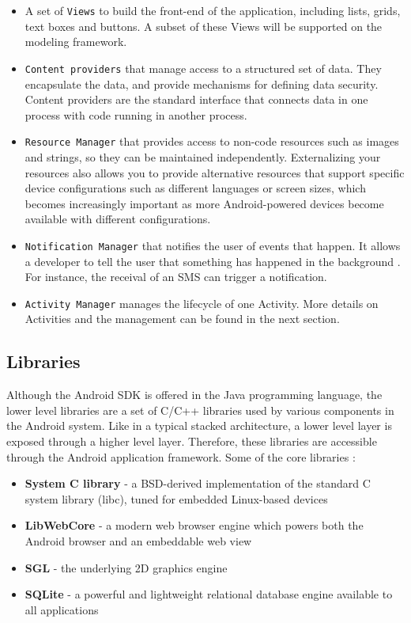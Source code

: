 \begin{itemize}
\item{A set of \texttt{Views} to build the front-end of the application, including lists, grids, text boxes and buttons. A subset of these Views will be supported on the modeling framework.}
\item{\texttt{Content providers} that manage access to a structured set of data. They encapsulate the data, and provide mechanisms for defining data security. Content providers are the standard interface that connects data in one process with code running in another process. \cite{ContentProviders}}
\item{\texttt{Resource Manager} that provides access to non-code resources such as images and strings, so they can be maintained independently.  Externalizing your resources also allows you to provide alternative resources that support specific device configurations such as different languages or screen sizes, which becomes increasingly important as more Android-powered devices become available with different configurations. \cite{AppResources}}
\item{\texttt{Notification Manager} that notifies the user of events that happen. It allows a developer to tell the user that something has happened in the background \cite{NotificationManager}. For instance, the receival of an SMS can trigger a notification.}
\item{\texttt{Activity Manager} manages the lifecycle of one Activity. More details on Activities and the management can be found in the next section.}
\end{itemize}

\subsection{Libraries}

Although the Android SDK is offered in the Java programming language, the lower level libraries are a set of C/C++ libraries used by various components in the Android system. Like in a typical stacked architecture, a lower level layer is exposed through a higher level layer. Therefore, these libraries are accessible through the Android application framework. Some of the core libraries \cite{WhatAndroid}:

\begin{itemize}
\item{\textbf{System C library} - a BSD-derived implementation of the standard C system library (libc), tuned for embedded Linux-based devices}
\item{\textbf{LibWebCore} - a modern web browser engine which powers both the Android browser and an embeddable web view}
\item{\textbf{SGL} - the underlying 2D graphics engine}
\item{\textbf{SQLite} - a powerful and lightweight relational database engine available to all applications}
\end{itemize} 

